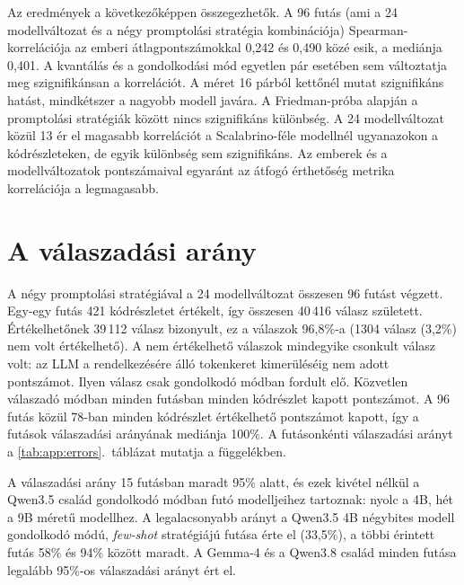 \documentclass[
]{elteikthesis}[2024/04/26]
\begin{document}
Az eredmények a következőképpen összegezhetők. A 96 futás (ami a 24
modellváltozat és a négy promptolási stratégia kombinációja)
Spearman-korrelációja az emberi átlagpontszámokkal 0,242 és 0,490 közé esik, a
mediánja 0,401. A kvantálás és a gondolkodási mód egyetlen pár esetében sem
változtatja meg szignifikánsan a korrelációt. A méret 16 párból kettőnél mutat
szignifikáns hatást, mindkétszer a nagyobb modell javára. A Friedman-próba
alapján a promptolási stratégiák között nincs szignifikáns különbség. A 24
modellváltozat közül 13 ér el magasabb korrelációt a Scalabrino-féle modellnél
ugyanazokon a kódrészleteken, de egyik különbség sem szignifikáns. Az emberek és
a modellváltozatok pontszámaival egyaránt az átfogó érthetőség metrika
korrelációja a legmagasabb.

\section{A válaszadási arány} %
\label{sec:results:answerrate}

A négy promptolási stratégiával a 24 modellváltozat összesen 96 futást végzett.
Egy-egy futás 421 kódrészletet értékelt, így összesen 40\,416 válasz született.
Értékelhetőnek 39\,112 válasz bizonyult, ez a válaszok 96,8\%-a (1304 válasz
(3,2\%) nem volt értékelhető). A nem értékelhető válaszok mindegyike csonkult
válasz volt: az LLM a rendelkezésére álló tokenkeret kimerüléséig nem adott
pontszámot. Ilyen válasz csak gondolkodó módban fordult elő. Közvetlen válaszadó
módban minden futásban minden kódrészlet kapott pontszámot. A 96 futás közül
78-ban minden kódrészlet értékelhető pontszámot kapott, így a futások
válaszadási arányának mediánja 100\%. A futásonkénti válaszadási arányt a
\ref{tab:app:errors}.~táblázat mutatja a függelékben.

A válaszadási arány 15 futásban maradt 95\% alatt, és ezek kivétel nélkül a
Qwen3.5 család gondolkodó módban futó modelljeihez tartoznak: nyolc a 4B, hét a
9B méretű modellhez. A legalacsonyabb arányt a Qwen3.5 4B négybites modell
gondolkodó módú, \textit{few-shot} stratégiájú futása érte el (33,5\%), a többi
érintett futás 58\% és 94\% között maradt. A Gemma-4 és a Qwen3.8 család minden
futása legalább 95\%-os válaszadási arányt ért el.
\end{document}
